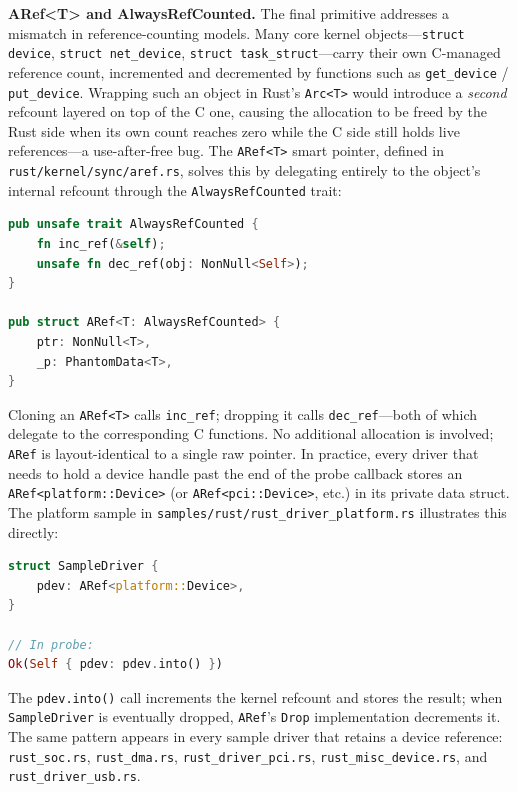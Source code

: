 \textbf{ARef\textless T\textgreater{} and AlwaysRefCounted.}
The final primitive addresses a mismatch in reference-counting models.
Many core kernel objects---\texttt{struct device}, \texttt{struct net\_device},
\texttt{struct task\_struct}---carry their own C-managed reference count, incremented and
decremented by functions such as \texttt{get\_device} / \texttt{put\_device}.
Wrapping such an object in Rust's \texttt{Arc<T>} would introduce a \emph{second} refcount
layered on top of the C one, causing the allocation to be freed by the Rust side when its own
count reaches zero while the C side still holds live references---a use-after-free bug.
The \texttt{ARef<T>} smart pointer, defined in \texttt{rust/kernel/sync/aref.rs}, solves this by
delegating entirely to the object's internal refcount through the \texttt{AlwaysRefCounted} trait:

\begin{lstlisting}[language=Rust,columns=fullflexible]
pub unsafe trait AlwaysRefCounted {
    fn inc_ref(&self);
    unsafe fn dec_ref(obj: NonNull<Self>);
}

pub struct ARef<T: AlwaysRefCounted> {
    ptr: NonNull<T>,
    _p: PhantomData<T>,
}
\end{lstlisting}

\noindent
Cloning an \texttt{ARef<T>} calls \texttt{inc\_ref}; dropping it calls \texttt{dec\_ref}---both
of which delegate to the corresponding C functions.
No additional allocation is involved; \texttt{ARef} is layout-identical to a single raw pointer.
In practice, every driver that needs to hold a device handle past the end of the probe callback
stores an \texttt{ARef<platform::Device>} (or \texttt{ARef<pci::Device>}, etc.) in its private
data struct.
The platform sample in \texttt{samples/rust/rust\_driver\_platform.rs} illustrates this directly:

\begin{lstlisting}[language=Rust,columns=fullflexible]
struct SampleDriver {
    pdev: ARef<platform::Device>,
}

// In probe:
Ok(Self { pdev: pdev.into() })
\end{lstlisting}

\noindent
The \texttt{pdev.into()} call increments the kernel refcount and stores the result; when
\texttt{SampleDriver} is eventually dropped, \texttt{ARef}'s \texttt{Drop} implementation
decrements it.
The same pattern appears in every sample driver that retains a device reference:
\texttt{rust\_soc.rs}, \texttt{rust\_dma.rs}, \texttt{rust\_driver\_pci.rs},
\texttt{rust\_misc\_device.rs}, and \texttt{rust\_driver\_usb.rs}.

